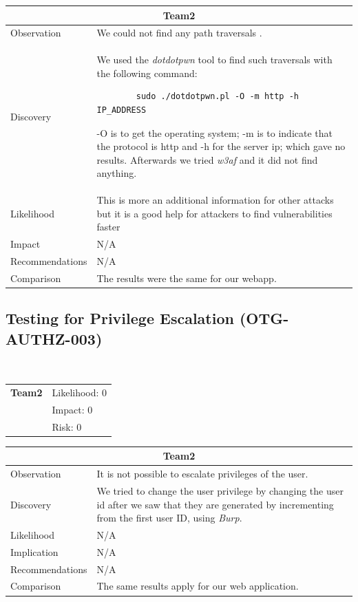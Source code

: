 \documentclass[headsepline,footsepline,footinclude=false,oneside,fontsize=11pt,paper=a4,listof=totoc,bibliography=totoc]{scrbook} %
\begin{document}
\begin{tabular}{ l|p{11cm}  }
	\hline
	\multicolumn{2}{c}{\textbf{Team2}} \\
	\hline
	Observation   & We could not find any path traversals .\\
	Discovery  & We used the \textit{dotdotpwn} tool to find such traversals with the following command:
	\begin{lstlisting}
		sudo ./dotdotpwn.pl -O -m http -h IP_ADDRESS 
	\end{lstlisting}
	-O is to get the operating system;  
	-m is to indicate that the protocol is http and -h for the server ip;  
	which gave no results.
	Afterwards we tried \textit{w3af} and it did not find anything.\\
	Likelihood & This is more an additional information for other attacks but it is a
	good help for attackers to find vulnerabilities faster \\
	Impact    & N/A \\
	Recommendations & N/A \\
	Comparison & The results were the same for our webapp.\\
	\hline
\end{tabular}  
 
\pagebreak

\subsection{Testing for Privilege Escalation (OTG-AUTHZ-003)}\

\begin{tabular}{cR{12cm}}
	\textbf{Team2} & Likelihood: 0\\& Impact: 0\\& Risk: 0
\end{tabular}

\begin{tabular}{ l|p{11cm}  }
	\hline
	\multicolumn{2}{c}{\textbf{Team2}} \\
	\hline
	Observation   & It is not possible to escalate privileges of the user.  \\
	Discovery  & We tried to change the user privilege by changing the user id after we saw that they are generated by incrementing from the first user ID, using \textit{Burp}.\\
	Likelihood & N/A \\
	Implication    & N/A \\
	Recommendations & N/A \\
	Comparison & The same results apply for our web application.\\
	\hline
\end{tabular}
\pagebreak
\end{document}
